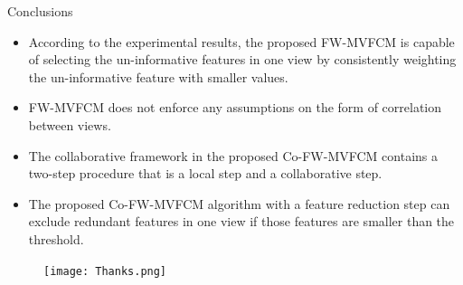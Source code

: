\documentclass[compress,sky blue]{beamer}
\begin{document}

\begin{frame}{Conclusions }
\vspace{-0.6cm}
\begin{itemize}
\item  According to the experimental results, the proposed FW-MVFCM is capable of selecting the un-informative features in one view by consistently weighting the un-informative feature with smaller values.
\item FW-MVFCM does not enforce any assumptions on the form of correlation between views. 
\item The collaborative framework  in the proposed Co-FW-MVFCM contains a two-step procedure that is a local step and a collaborative step.
\item The proposed Co-FW-MVFCM algorithm with a feature reduction step can exclude redundant features in one view if those features are smaller than the threshold.
\end{itemize}

\end{frame}



\begin{frame}[plain,c]
\begin{figure}
\texttt{[image: Thanks.png]}
\end{figure}
\end{frame}

\end{document}
